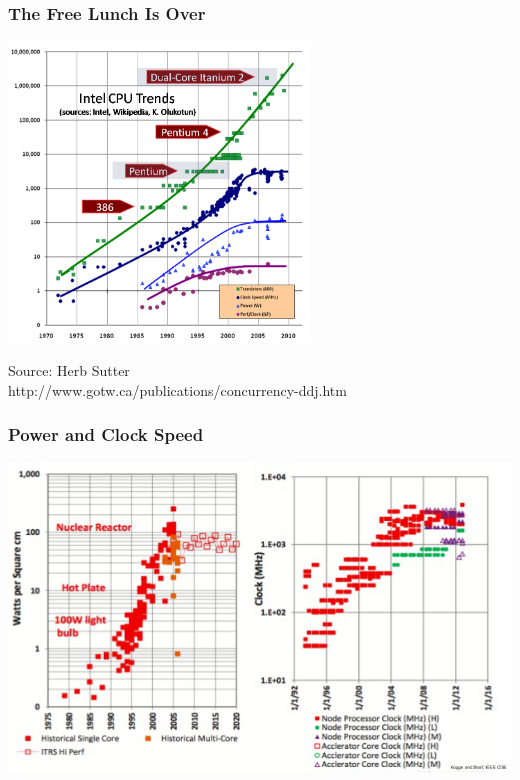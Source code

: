 \documentclass[10pt,t]{beamer}
\begin{document}
\begin{frame}
  \frametitle{The Free Lunch Is Over}
  \begin{center}
    \includegraphics[width=0.6\textwidth]{CPUTrend}
    
    
    \tiny{Source: Herb Sutter\\
      http://www.gotw.ca/publications/concurrency-ddj.htm}
  \end{center}
\end{frame}

\begin{frame}
  \frametitle{Power and Clock Speed}
  \includegraphics[width=\textwidth]{./CPUheat}
\end{frame}
\end{document}

